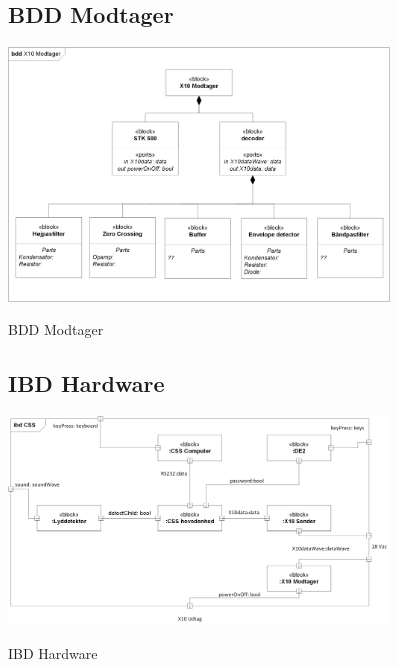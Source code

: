 \begin{figure}[htbp] \centering
\subsection{BDD Modtager}
{\includegraphics[width=0.9\textwidth]{billeder/diagrammer/BDD_Modtager}}
\caption{BDD Modtager}
\label{lab:bddmodtager}
\end{figure}

\begin{figure}[htbp] \centering
\subsection{IBD Hardware}
{\includegraphics[width=0.9\textwidth]{billeder/diagrammer/IBD_Hardware}}
\caption{IBD Hardware}
\label{lab:ibdhardware}
\end{figure}

